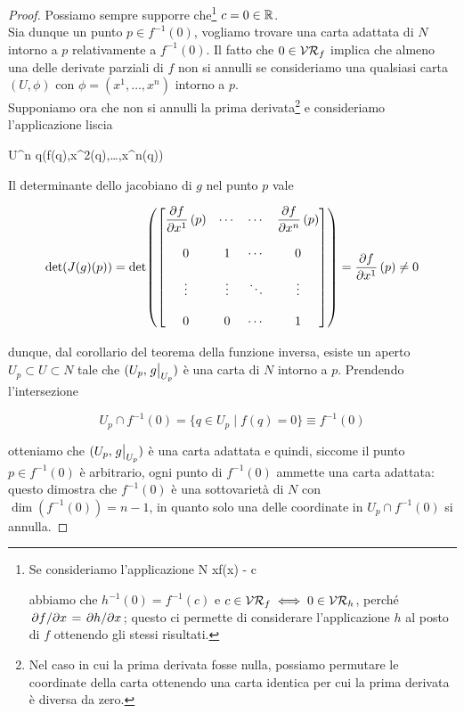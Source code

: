 \begin{proof}
	Possiamo sempre supporre che\footnote{%
		Se consideriamo l'applicazione
			{N}{\R}
			{x}{f(x) - c}
		
		abbiamo che $ h^{-1}(0) = f^{-1}(c) $ e $ c \in \mathcal{VR}_{f} \iff 0 \in \mathcal{VR}_{h} $, perché $ \pdv*{f}{x} = \pdv*{h}{x} $; questo ci permette di considerare l'applicazione $ h $ al posto di $ f $ ottenendo gli stessi risultati.%
	} $ c = 0 \in \mathbb{R} $.\\
	Sia dunque un punto $ p \in f^{-1}(0) $, vogliamo trovare una carta adattata di $ N $ intorno a $ p $ relativamente a $ f^{-1}(0) $. Il fatto che $ 0 \in \mathcal{VR}_{f} $ implica che almeno una delle derivate parziali di $ f $ non si annulli se consideriamo una qualsiasi carta $ (U,\phi) $ con $ \phi = (x^{1},\dots,x^{n}) $ intorno a $ p $.\\
	Supponiamo ora che non si annulli la prima derivata\footnote{%
		Nel caso in cui la prima derivata fosse nulla, possiamo permutare le coordinate della carta ottenendo una carta identica per cui la prima derivata è diversa da zero.%
	} e consideriamo l'applicazione liscia

		{U}{\R^{n}}
		{q}{(f(q),x^{2}(q),\dots,x^{n}(q))}

	Il determinante dello jacobiano di $ g $ nel punto $ p $ vale

	\begin{equation}
		\det(J(g)(p)) = \det( \bmqty{%
			\dpdv{f}{x^{1}} \, (p) & \cdots & \cdots & \dpdv{f}{x^{n}} \, (p) \\\\ %
			0 & 1 & \cdots & 0 \\\\ %
			\vdots & \vdots & \ddots & \vdots \\\\ %
			0 & 0 & \cdots & 1
			} ) %
		= \dpdv{f}{x^{1}} \, (p) \neq 0
	\end{equation}

	dunque, dal corollario del teorema della funzione inversa, esiste un aperto $ U_{p} \subset U \subset N $ tale che $ (U_{p},\eval{g}_{U_{p}}) $ è una carta di $ N $ intorno a $ p $. Prendendo l'intersezione
	
	\begin{equation}
		U_{p} \cap f^{-1}(0) = \{ q \in U_{p} \mid f(q)=0 \} \equiv f^{-1}(0)
	\end{equation}

	otteniamo che $ (U_{p},\eval{g}_{U_{p}}) $ è una carta adattata e quindi, siccome il punto $ p \in f^{-1}(0) $ è arbitrario, ogni punto di $ f^{-1}(0) $ ammette una carta adattata: questo dimostra che $ f^{-1}(0) $ è una sottovarietà di $ N $ con $ \dim(f^{-1}(0)) = n-1 $, in quanto solo una delle coordinate in $ U_{p} \cap f^{-1}(0) $ si annulla.
\end{proof}

